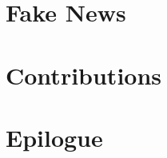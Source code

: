 \documentclass[
oneside,openright,titlepage,numbersa=noenddot,%
                headinclude,footinclude,cleardoublepage=empty,abstract=on,
                BCOR=5mm,paper=a4,fontsize=11pt]{scrreprt}
\renewcommand\bibname{References}
\begin{document}
\frenchspacing
\raggedbottom
{} %
\pagestyle{plain}



% 


% 
\cleardoublepage
\cleardoublepage
\cleardoublepage
\cleardoublepage


\cleardoublepage
\pagestyle{scrheadings}

\cleardoublepage
\part{Fake News}\label{pt:part-1}
\cleardoublepage



\cleardoublepage
\part{Contributions}\label{pt:part-2}
\cleardoublepage





\part{Epilogue}\label{pt:part-3}
\cleardoublepage







\cleardoublepage

\end{document}
